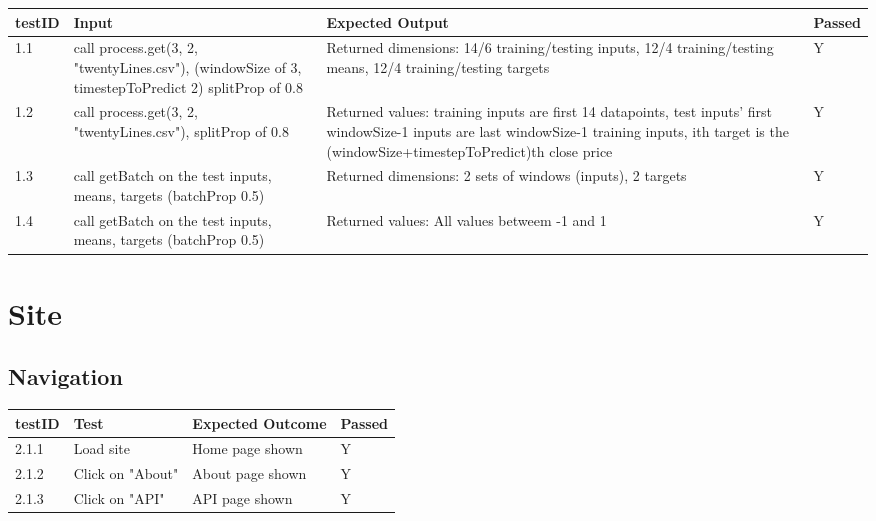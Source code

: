         \begin{tabular}{|p{1cm}|p{4cm}|p{4cm}|p{2cm}|}
            \hline
            testID & Input & Expected Output & Passed\\
            \hline
            1.1 & call process.get(3, 2, "twentyLines.csv"), (windowSize of 3, timestepToPredict 2) splitProp of 0.8 & Returned dimensions: 14/6 training/testing inputs, 12/4 training/testing means, 12/4 training/testing targets&Y\\
            \hline 
            1.2 & call process.get(3, 2, "twentyLines.csv"), splitProp of 0.8 & Returned values: training inputs are first 14 datapoints, test inputs' first windowSize-1 inputs are last windowSize-1 training inputs, ith target is the (windowSize+timestepToPredict)th close price&Y\\
            \hline 
            1.3 & call getBatch on the test inputs, means, targets (batchProp 0.5) & Returned dimensions: 2 sets of windows (inputs), 2 targets&Y\\
            \hline 
            1.4 & call getBatch on the test inputs, means, targets (batchProp 0.5) & Returned values: All values betweem -1 and 1 &Y\\
            \hline 
        \end{tabular} 


        \section{Site}
        \subsection{Navigation}
        \begin{tabular}{|p{1cm}|p{4cm}|p{4cm}|p{2cm}|}
            \hline
            testID & Test & Expected Outcome & Passed\\
            \hline
            2.1.1 & Load site & Home page shown & Y\\
            \hline 
            2.1.2 & Click on "About" & About page shown & Y\\ 
            \hline 
            2.1.3 & Click on "API" & API page shown & Y\\ 
            \hline 
            
        \end{tabular} 

